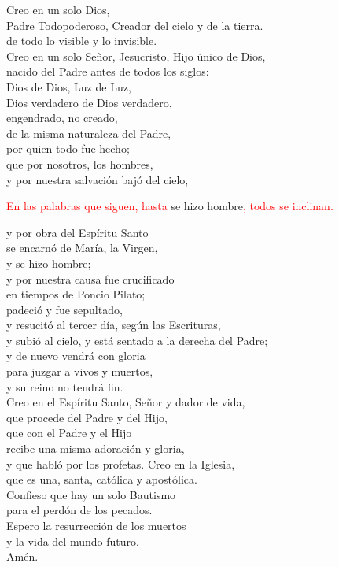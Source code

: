 \documentclass[12pt, letterpaper]{report}
\begin{document}
\noindent
\Large {Creo en un solo Dios,\\
    Padre Todopoderoso, Creador del cielo y de la tierra.\\
    de todo lo visible y lo invisible.\\
    Creo en un solo Se\~nor, Jesucristo, Hijo \'unico de Dios,\\
    nacido del Padre antes de todos los siglos:\\
    Dios de Dios, Luz de Luz,\\
    Dios verdadero de Dios verdadero,\\
    engendrado, no creado,\\
    de la misma naturaleza del Padre,\\
    por quien todo fue hecho;\\
    que por nosotros, los hombres,\\
    y por nuestra salvaci\'on baj\'o del cielo,
}

\large {\textcolor{red}{En las palabras que siguen, hasta} se hizo hombre\textcolor{red}{, todos se inclinan.}}

\noindent
\Large {y por obra del Esp\'iritu Santo\\
    se encarn\'o de Mar\'ia, la Virgen,\\
    y se hizo hombre;\\
    y por nuestra causa fue crucificado\\
    en tiempos de Poncio Pilato;\\
    padeci\'o y fue sepultado,\\
    y resucit\'o al tercer d\'ia, seg\'un las Escrituras,\\
    y subi\'o al cielo, y est\'a sentado a la derecha del Padre;\\
    y de nuevo vendr\'a con gloria\\
    para juzgar a vivos y muertos,\\
    y su reino no tendr\'a fin.\\
    Creo en el Esp\'iritu Santo, Se\~nor y dador de vida,\\
    que procede del Padre y del Hijo,\\
    que con el Padre y el Hijo\\
    recibe una misma adoraci\'on y gloria,\\
    y que habl\'o por los profetas.
    Creo en la Iglesia,\\
    que es una, santa, cat\'olica y apost\'olica.\\
    Confieso que hay un solo Bautismo\\
    para el perd\'on de los pecados.\\
    Espero la resurrecci\'on de los muertos\\
    y la vida del mundo futuro.\\
    Am\'en.
}
\end{document}
